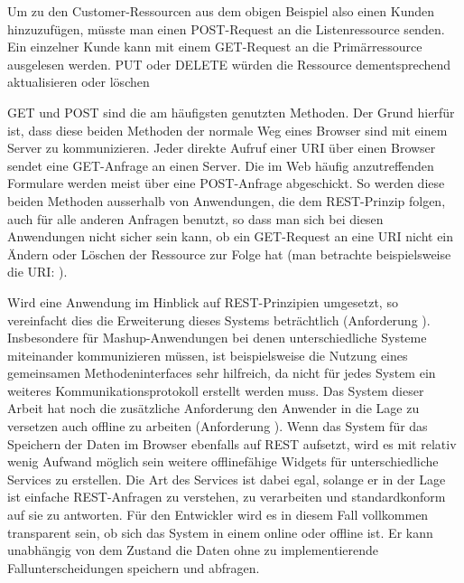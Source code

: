 Um zu den Customer-Ressourcen aus dem obigen Beispiel also einen Kunden hinzuzufügen, müsste man einen POST-Request an die Listenressource  senden. Ein einzelner Kunde kann mit einem GET-Request an die Primärressource  ausgelesen werden. PUT oder DELETE würden die Ressource dementsprechend aktualisieren oder löschen

GET und POST sind die am häufigsten genutzten Methoden. Der Grund hierfür ist, dass diese beiden Methoden der normale Weg eines Browser sind mit einem Server zu kommunizieren. Jeder direkte Aufruf einer URI über einen Browser sendet eine GET-Anfrage an einen Server. Die im Web häufig anzutreffenden Formulare werden meist über eine POST-Anfrage abgeschickt. So werden diese beiden Methoden ausserhalb von Anwendungen, die dem REST-Prinzip folgen, auch für alle anderen Anfragen benutzt, so dass man sich bei diesen Anwendungen nicht sicher sein kann, ob ein GET-Request an eine URI nicht ein Ändern oder Löschen der Ressource zur Folge hat (man betrachte beispielsweise die URI: ).

Wird eine Anwendung im Hinblick auf REST-Prinzipien umgesetzt, so vereinfacht dies die Erweiterung dieses Systems beträchtlich (Anforderung ). Insbesondere für Mashup-Anwendungen bei denen unterschiedliche Systeme miteinander kommunizieren müssen, ist beispielsweise die Nutzung eines gemeinsamen Methodeninterfaces sehr hilfreich, da nicht für jedes System ein weiteres Kommunikationsprotokoll erstellt werden muss. Das System dieser Arbeit hat noch die zusätzliche Anforderung den Anwender in die Lage zu versetzen auch offline zu arbeiten (Anforderung ). Wenn das System für das Speichern der Daten im Browser ebenfalls auf REST aufsetzt, wird es mit relativ wenig Aufwand möglich sein weitere offlinefähige Widgets für unterschiedliche Services zu erstellen. Die Art des Services ist dabei egal, solange er in der Lage ist einfache REST-Anfragen zu verstehen, zu verarbeiten und standardkonform auf sie zu antworten. Für den Entwickler wird es in diesem Fall vollkommen transparent sein, ob sich das System in einem online oder offline ist. Er kann unabhängig von dem Zustand die Daten ohne zu implementierende Fallunterscheidungen speichern und abfragen.

